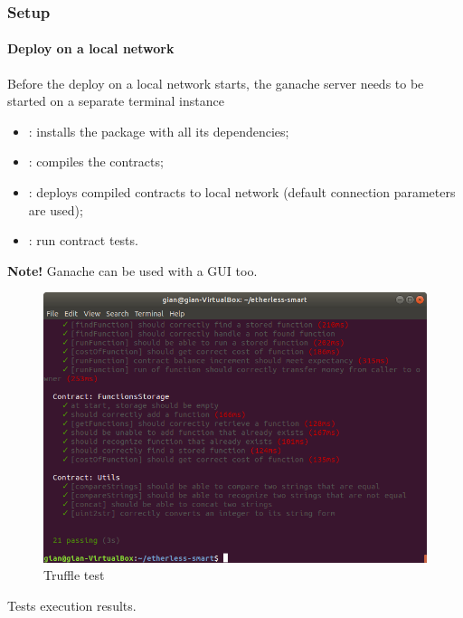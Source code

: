 \subsubsection{Setup}
\paragraph{Deploy on a local network}
 Before the deploy on a local network starts, the ganache server needs to be started on a separate terminal instance 
\begin{itemize}
    \item {} : installs the package with all its dependencies;
    \item {}: compiles the contracts;
    \item {}: deploys compiled contracts to local network (default connection parameters are used);
    \item {}: run contract tests.
\end{itemize}
\textbf{Note!} Ganache can be used with a GUI too.
\begin{figure}[h]
	\centering
	\includegraphics[width=\textwidth]{res/img/truffleTest.png}
	\caption{Truffle test}
\end{figure}
Tests execution results.
